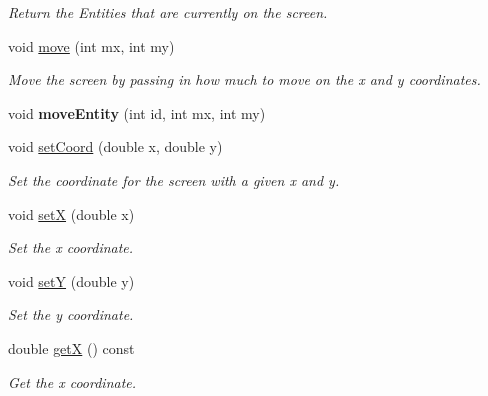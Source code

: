 \begin{DoxyCompactItemize}
\begin{DoxyCompactList}\small\item\em Return the Entities that are currently on the screen. \end{DoxyCompactList}\item 
\mbox{\label{classLevel_a9184b25173fbf468a63a633bd3510bd6}} 
void \hyperlink{classLevel_a9184b25173fbf468a63a633bd3510bd6}{move} (int mx, int my)
\begin{DoxyCompactList}\small\item\em Move the screen by passing in how much to move on the x and y coordinates. \end{DoxyCompactList}\item 
\mbox{\label{classLevel_af4788055ad02e14ea48958c9c871fee3}} 
void {\bfseries move\+Entity} (int id, int mx, int my)
\item 
\mbox{\label{classLevel_a3ff79425060f959496d64aa052ef3cf6}} 
void \hyperlink{classLevel_a3ff79425060f959496d64aa052ef3cf6}{set\+Coord} (double x, double y)
\begin{DoxyCompactList}\small\item\em Set the coordinate for the screen with a given x and y. \end{DoxyCompactList}\item 
\mbox{\label{classLevel_a6212b3c03b3efc82cf69e642cc093959}} 
void \hyperlink{classLevel_a6212b3c03b3efc82cf69e642cc093959}{setX} (double x)
\begin{DoxyCompactList}\small\item\em Set the x coordinate. \end{DoxyCompactList}\item 
\mbox{\label{classLevel_a7c67443008f7e0f4b5d1630ff2dcf179}} 
void \hyperlink{classLevel_a7c67443008f7e0f4b5d1630ff2dcf179}{setY} (double y)
\begin{DoxyCompactList}\small\item\em Set the y coordinate. \end{DoxyCompactList}\item 
\mbox{\label{classLevel_a5de2ec6e9ec70130b18fe6050b9e89a0}} 
double \hyperlink{classLevel_a5de2ec6e9ec70130b18fe6050b9e89a0}{getX} () const
\begin{DoxyCompactList}\small\item\em Get the x coordinate. \end{DoxyCompactList}\item 

\end{DoxyCompactItemize}
